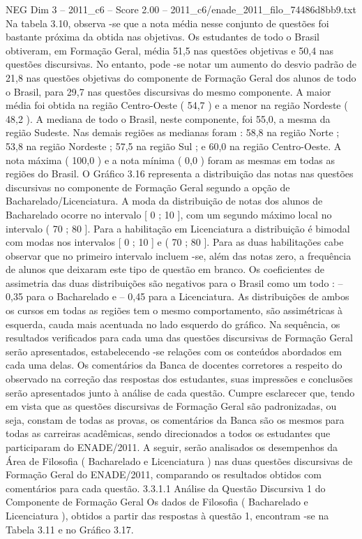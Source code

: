 \begin{textsample}{NEG Dim 3 – 2011\_c6 – Score 2.00 – 2011\_c6/enade\_2011\_filo\_74486d8bb9.txt}
Na tabela 3.10, observa -se que a nota média nesse conjunto de questões foi bastante próxima da obtida nas objetivas.
Os estudantes de todo o Brasil obtiveram, em Formação Geral, média 51,5 nas questões objetivas e 50,4 nas questões discursivas.
No entanto, pode -se notar um aumento do desvio padrão de 21,8 nas questões objetivas do componente de Formação Geral dos alunos de todo o Brasil, para 29,7 nas questões discursivas do mesmo componente.
A maior média foi obtida na região Centro-Oeste ( 54,7 ) e a menor na região Nordeste ( 48,2 ).
A mediana de todo o Brasil, neste componente, foi 55,0, a mesma da região Sudeste.
Nas demais regiões as medianas foram : 58,8 na região Norte ; 53,8 na região Nordeste ; 57,5 na região Sul ; e 60,0 na região Centro-Oeste.
A nota máxima ( 100,0 ) e a nota mínima ( 0,0 ) foram as mesmas em todas as regiões do Brasil.
O Gráfico 3.16 representa a distribuição das notas nas questões discursivas no componente de Formação Geral segundo a opção de Bacharelado/Licenciatura.
A moda da distribuição de notas dos alunos de Bacharelado ocorre no intervalo [ 0 ; 10 ], com um segundo máximo local no intervalo ( 70 ; 80 ].
Para a habilitação em Licenciatura a distribuição é bimodal com modas nos intervalos [ 0 ; 10 ] e ( 70 ; 80 ].
Para as duas habilitações cabe observar que no primeiro intervalo incluem -se, além das notas zero, a frequência de alunos que deixaram este tipo de questão em branco.
Os coeficientes de assimetria das duas distribuições são negativos para o Brasil como um todo : – 0,35 para o Bacharelado e – 0,45 para a Licenciatura.
As distribuições de ambos os cursos em todas as regiões tem o mesmo comportamento, são assimétricas à esquerda, cauda mais acentuada no lado esquerdo do gráfico.
Na sequência, os resultados verificados para cada uma das questões discursivas de Formação Geral serão apresentados, estabelecendo -se relações com os conteúdos abordados em cada uma delas.
Os comentários da Banca de docentes corretores a respeito do observado na correção das respostas dos estudantes, suas impressões e conclusões serão apresentados junto à análise de cada questão.
Cumpre esclarecer que, tendo em vista que as questões discursivas de Formação Geral são padronizadas, ou seja, constam de todas as provas, os comentários da Banca são os mesmos para todas as carreiras acadêmicas, sendo direcionados a todos os estudantes que participaram do ENADE/2011.
A seguir, serão analisados os desempenhos da Área de Filosofia ( Bacharelado e Licenciatura ) nas duas questões discursivas de Formação Geral do ENADE/2011, comparando os resultados obtidos com comentários para cada questão. 3.3.1.1 Análise da Questão Discursiva 1 do Componente de Formação Geral Os dados de Filosofia ( Bacharelado e Licenciatura ), obtidos a partir das respostas à questão 1, encontram -se na Tabela 3.11 e no Gráfico 3.17.

\end{textsample}
